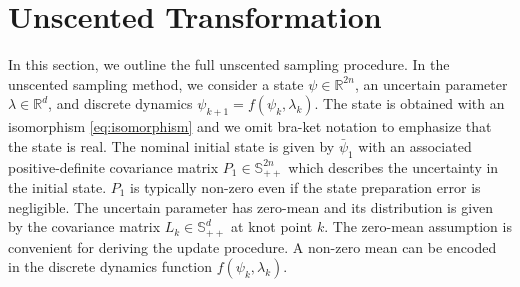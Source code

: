 \section{Unscented Transformation}
\label{appendix:unscented}
In this section, we outline the full unscented sampling procedure.
In the unscented sampling method, we consider a state $\psi \in \mathbb{R}^{2n}$, 
an uncertain parameter $\lambda \in \mathbb{R}^{d}$, and discrete dynamics
$\psi_{k + 1} = f(\psi_{k}, \lambda_{k})$.
The state is obtained with an isomorphism \eqref{eq:isomorphism} and
we omit bra-ket notation to emphasize that the state is real.
The nominal initial state is given by $\bar{\psi}_{1}$ with an associated
positive-definite covariance matrix $P_{1} \in \mathbb{S}_{++}^{2n}$
which describes the uncertainty in the initial state.
$P_{1}$ is typically non-zero even if the state preparation error is negligible.
The uncertain parameter has zero-mean
and its distribution is given by the covariance matrix
$L_{k} \in \mathbb{S}_{++}^{d}$ at knot point $k$. The zero-mean assumption
is convenient for deriving the update procedure. A non-zero mean can be encoded
in the discrete dynamics function $f(\psi_{k}, \lambda_{k})$.

